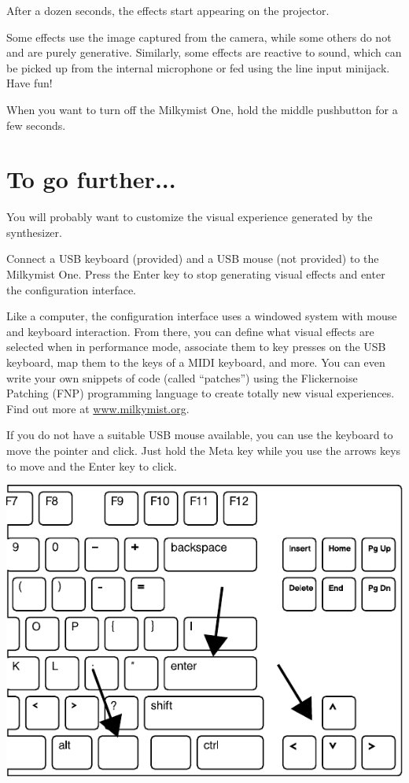 \documentclass{leaflet}
\begin{document}
After a dozen seconds, the effects start appearing on the projector.

Some effects use the image captured from the camera, while some others do not and are purely generative. Similarly, some effects are reactive to sound, which can be picked up from the internal microphone or fed using the line input minijack. Have fun!

When you want to turn off the Milkymist One, hold the middle pushbutton for a few seconds.

\section{To go further...}
You will probably want to customize the visual experience generated by the synthesizer.

Connect a USB keyboard (provided) and a USB mouse (not provided) to the Milkymist One. Press the Enter key to stop generating visual effects and enter the configuration interface.

Like a computer, the configuration interface uses a windowed system with mouse and keyboard interaction. From there, you can define what visual effects are selected when in performance mode, associate them to key presses on the USB keyboard, map them to the keys of a MIDI keyboard, and more. You can even write your own snippets of code (called ``patches'') using the Flickernoise Patching (FNP) programming language to create totally new visual experiences. Find out more at \url{www.milkymist.org}.

If you do not have a suitable USB mouse available, you can use the keyboard to move the pointer and click. Just hold the Meta key while you use the arrows keys to move and the Enter key to click.

\includegraphics[width=\textwidth]{keyboard.pdf}
\end{document}
